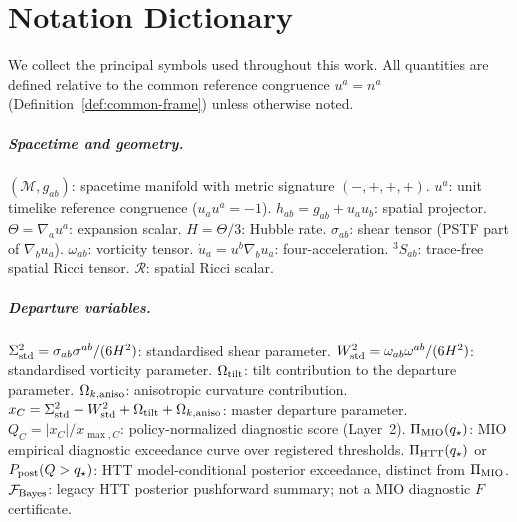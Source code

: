 
\appendix


\chapter{Notation Dictionary}
\label{app:notation}

We collect the principal symbols used throughout this work.
All quantities are defined relative to the common reference
congruence $u^a = n^a$
(Definition~\ref{def:common-frame}) unless otherwise noted.

\medskip

\paragraph{Spacetime and geometry.}
$(\mathcal{M}, g_{ab})$: spacetime manifold with metric
signature $(-,+,+,+)$.
$u^a$: unit timelike reference congruence ($u_a u^a = -1$).
$h_{ab} = g_{ab} + u_a u_b$: spatial projector.
$\Theta = \nabla_a u^a$: expansion scalar.
$H = \Theta/3$: Hubble rate.
$\sigma_{ab}$: shear tensor (PSTF part of $\nabla_b u_a$).
$\omega_{ab}$: vorticity tensor.
$\dot{u}_a = u^b \nabla_b u_a$: four-acceleration.
${}^3\!S_{ab}$: trace-free spatial Ricci tensor.
$\mathcal{R}$: spatial Ricci scalar.

\paragraph{Departure variables.}
$\Sigma^2_{\mathrm{std}} = \sigma_{ab}\sigma^{ab}/(6H^2)$:
standardised shear parameter.
$W^2_{\mathrm{std}} = \omega_{ab}\omega^{ab}/(6H^2)$:
standardised vorticity parameter.
$\Omega_{\mathrm{tilt}}$: tilt contribution to the departure parameter.
$\Omega_{k,\mathrm{aniso}}$: anisotropic curvature contribution.
$x_C = \Sigma^2_{\mathrm{std}} - W^2_{\mathrm{std}} + \Omega_{\mathrm{tilt}} + \Omega_{k,\mathrm{aniso}}$:
master departure parameter.
$Q_C = |x_C|/x_{\max,C}$: policy-normalized diagnostic score
(Layer~2).
$\Pi_{\rm MIO}(q_\star)$: MIO empirical diagnostic exceedance
curve over registered thresholds.
$\Pi_{\rm HTT}(q_\star)$ or $P_{\rm post}(Q>q_\star)$: HTT
model-conditional posterior exceedance, distinct from
$\Pi_{\rm MIO}$.
$\mathcal{F}_{\rm Bayes}$: legacy HTT posterior pushforward
summary; not a MIO diagnostic $F$ certificate.

